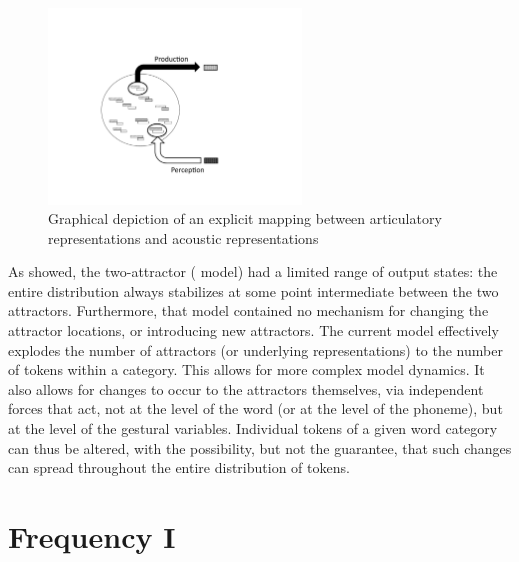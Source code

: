 \begin{figure}[H]

\includegraphics[width=0.60\textwidth]{figures/SeparateReps.pdf}\caption{\label{fig:P-toP-mapping}Graphical depiction of an explicit mapping
between articulatory representations and acoustic representations }

\end{figure}

As  showed, the two-attractor (
model) had a limited range of output states: the entire distribution
always stabilizes at some point intermediate between the two attractors.
Furthermore, that model contained no mechanism for changing the attractor
locations, or introducing new attractors. The current model effectively
explodes the number of attractors (or underlying representations)
to the number of tokens within a category. This allows for more complex
model dynamics. It also allows for changes to occur to the attractors
themselves, via independent forces that act, not at the level of the
word (or at the level of the phoneme), but at the level of the gestural
variables. Individual tokens of a given word category can thus be
altered, with the possibility, but not the guarantee, that such changes
can spread throughout the entire distribution of tokens.

\section{\label{sec:Frequency-I}Frequency I}


